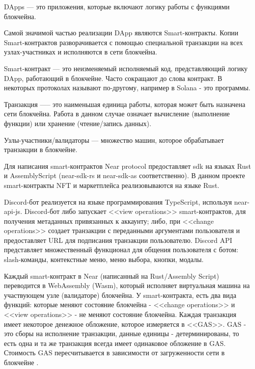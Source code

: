 \begin{definition}
    DApps --- это приложения, которые включают логику работы с функциями блокчейна\cite{ramamurthy2020blockchain}.
\end{definition}

Самой значимой частью реализации DApp являются Smart-контракты. Копии Smart-контрактов разворачивается с помощью специальной транзакции на всех узлах-участниках и исполняются в сети блокчейна.

\begin{definition}
    Smart-контракт --- это неизменяемый исполняемый код, представляющий логику DApp, работающий в блокчейне\cite{ramamurthy2020blockchain}. Часто сокращают до слова контракт. В некоторых протоколах называют по-другому, например в Solana - это программы\cite{solanaprogramlibrarydocs}.
\end{definition}

\begin{definition}
    Транзакция —-- это наименьшая единица работы, которая может быть назначена сети блокчейна. Работа в данном случае означает вычисление (выполнение функции) или хранение (чтение/запись данных)\cite{neardocumentationtransaction}.
\end{definition}

\begin{definition}
    Узлы-участники/валидаторы --- множество машин, которое обрабатывает транзакции в блокчейне.
\end{definition}

Для написания smart-контрактов Near protocol предоставляет sdk на языках Rust и AssemblyScript (near-sdk-rs\cite{nearsdkrs} и near-sdk-as\cite{nearsdkas} соответственно). В данном проекте smart-контракты NFT и маркетплейса реализовываются на языке Rust.

Discord-бот реализуется на языке программирования TypeScript, используя near-api-js\cite{nearapijs}. Discord-бот либо запускает <<view operations>> smart-контрактов, для получения метаданных привязанных к аккаунту; либо, при <<change operations>> создает транзакции с переданными аргументами пользователя и предоставляет URL для подписания транзакции пользователю. Discord API представляет множественный функционал для общения пользователя с ботом: slash-команды\cite{discordjsbuttons}, контекстные меню\cite{discordtscontextmenu}, меню выбора\cite{discordjsselectmenus}, кнопки\cite{discordjsbuttons}, модалы\cite{discordjsmodals}.


\begin{remark}
    Каждый smart-контракт в Near (написанный на Rust/Assembly Script) переводится в WebAssembly (Wasm), который исполняет виртуальная машина на участвующем узле (валидаторе) блокчейна. У smart-контракта, есть два вида функций: которые меняют состояние блокчейна - <<change operations>> и <<view operations>> - не меняют состояние блокчейна. Каждая транзакция имеет некоторое денежное обложение, которое измеряется в <<GAS>>. GAS - это сборы на исполнение транзакции, данные единицы - детерминированы, то есть одна и та же транзакция всегда имеет одинаковое обложение в GAS. Стоимость GAS пересчитывается в зависимости от загруженности сети в блокчейне \cite{neargas}.
\end{remark}

